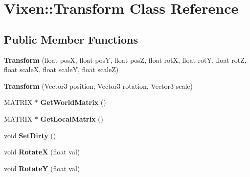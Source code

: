 \hypertarget{class_vixen_1_1_transform}{}\section{Vixen\+:\+:Transform Class Reference}
\label{class_vixen_1_1_transform}
\subsection*{Public Member Functions}
\begin{DoxyCompactItemize}
\item 
\hypertarget{class_vixen_1_1_transform_a67d6ea5ea7a3e259e82d4f32a0430def}{}{\bfseries Transform} (float pos\+X, float pos\+Y, float pos\+Z, float rot\+X, float rot\+Y, float rot\+Z, float scale\+X, float scale\+Y, float scale\+Z)\label{class_vixen_1_1_transform_a67d6ea5ea7a3e259e82d4f32a0430def}

\item 
\hypertarget{class_vixen_1_1_transform_a30e1bef9f3cdd8bf5f4aa3407f4f4100}{}{\bfseries Transform} (Vector3 position, Vector3 rotation, Vector3 scale)\label{class_vixen_1_1_transform_a30e1bef9f3cdd8bf5f4aa3407f4f4100}

\item 
\hypertarget{class_vixen_1_1_transform_a1a1d45e3d10d2c8148b931fcdec68144}{}M\+A\+T\+R\+I\+X $\ast$ {\bfseries Get\+World\+Matrix} ()\label{class_vixen_1_1_transform_a1a1d45e3d10d2c8148b931fcdec68144}

\item 
\hypertarget{class_vixen_1_1_transform_a12d1251047bcabc58319d79a7f2ee269}{}M\+A\+T\+R\+I\+X $\ast$ {\bfseries Get\+Local\+Matrix} ()\label{class_vixen_1_1_transform_a12d1251047bcabc58319d79a7f2ee269}

\item 
\hypertarget{class_vixen_1_1_transform_a1814733048f47049c5615dcd5b97c6d4}{}void {\bfseries Set\+Dirty} ()\label{class_vixen_1_1_transform_a1814733048f47049c5615dcd5b97c6d4}

\item 
\hypertarget{class_vixen_1_1_transform_a59b9c8ef88fb2173a25107bd2f984d2a}{}void {\bfseries Rotate\+X} (float val)\label{class_vixen_1_1_transform_a59b9c8ef88fb2173a25107bd2f984d2a}

\item 
\hypertarget{class_vixen_1_1_transform_a600bc2cfe7f70c567856c11d9f1353b4}{}void {\bfseries Rotate\+Y} (float val)\label{class_vixen_1_1_transform_a600bc2cfe7f70c567856c11d9f1353b4}


\end{DoxyCompactItemize}
